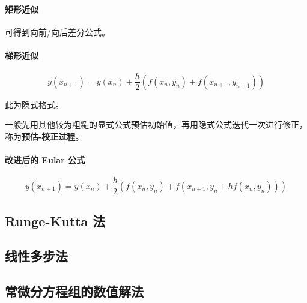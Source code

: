 \documentclass[a4paper,12pt]{article}
\begin{document}
\paragraph{矩形近似}
可得到向前/向后差分公式。
\paragraph{梯形近似}
\[
y(x_{n+1})=y(x_n)+\frac{h}{2}(f(x_n,y_n)+f(x_{n+1},y_{n+1}))
\]\par
此为隐式格式。\par
一般先用其他较为粗糙的显式公式预估初始值，再用隐式公式迭代一次进行修正，称为\textbf{预估-校正过程}。
\paragraph{改进后的 Eular 公式}
\[
y(x_{n+1})=y(x_n)+\frac{h}{2}(f(x_n,y_n)+f(x_{n+1},y_{n}+hf(x_n,y_n)))
\]
\subsection{Runge-Kutta 法}

\subsection{线性多步法}

\subsection{常微分方程组的数值解法}
\end{document}
